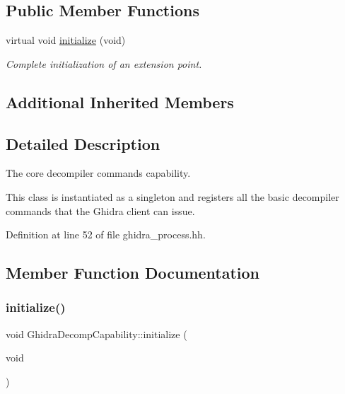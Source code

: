 \subsection*{Public Member Functions}
\begin{DoxyCompactItemize}
\item 
virtual void \mbox{\hyperlink{class_ghidra_decomp_capability_a37a40ab02f284b0030fc6c07e0a8da58}{initialize}} (void)
\begin{DoxyCompactList}\small\item\em Complete initialization of an extension point. \end{DoxyCompactList}\end{DoxyCompactItemize}
\subsection*{Additional Inherited Members}


\subsection{Detailed Description}
The core decompiler commands capability. 

This class is instantiated as a singleton and registers all the basic decompiler commands that the Ghidra client can issue. 

Definition at line 52 of file ghidra\+\_\+process.\+hh.



\subsection{Member Function Documentation}
\mbox{\label{class_ghidra_decomp_capability_a37a40ab02f284b0030fc6c07e0a8da58}} 
\subsubsection{\texorpdfstring{initialize()}{initialize()}}
{\footnotesize\ttfamily void Ghidra\+Decomp\+Capability\+::initialize (\begin{DoxyParamCaption}\item[{void}]{ }\end{DoxyParamCaption})\hspace{0.3cm}{\ttfamily [virtual]}}



